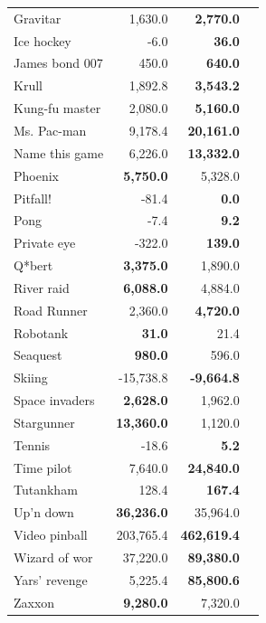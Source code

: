 \begin{table}[ht]
\begin{center}
\begin{small}
\begin{tabular}{lrrl}
Gravitar        & 1,630.0           & \textbf{2,770.0}   \\
Ice hockey      & -6.0              & \textbf{36.0}      \\
James bond 007  & 450.0             & \textbf{640.0}     \\
Krull           & 1,892.8           & \textbf{3,543.2}   \\
Kung-fu master  & 2,080.0           & \textbf{5,160.0}   \\
Ms. Pac-man     & 9,178.4           & \textbf{20,161.0}  \\
Name this game  & 6,226.0           & \textbf{13,332.0}  \\
Phoenix         & \textbf{5,750.0}  & 5,328.0            \\
Pitfall!        & -81.4             & \textbf{0.0}       \\
Pong            & -7.4              & \textbf{9.2}       \\
Private eye     & -322.0            & \textbf{139.0}     \\
Q*bert          & \textbf{3,375.0}  & 1,890.0            \\
River raid      & \textbf{6,088.0}  & 4,884.0            \\
Road Runner     & 2,360.0           & \textbf{4,720.0}   \\
Robotank        & \textbf{31.0}     & 21.4               \\
Seaquest        & \textbf{980.0}    & 596.0              \\
Skiing          & -15,738.8         & \textbf{-9,664.8}  \\
Space invaders  & \textbf{2,628.0}  & 1,962.0            \\
Stargunner      & \textbf{13,360.0} & 1,120.0            \\
Tennis          & -18.6             & \textbf{5.2}       \\
Time pilot      & 7,640.0           & \textbf{24,840.0}  \\
Tutankham       & 128.4             & \textbf{167.4}     \\
Up'n down       & \textbf{36,236.0} & 35,964.0           \\
Video pinball   & 203,765.4         & \textbf{462,619.4} \\
Wizard of wor   & 37,220.0          & \textbf{89,380.0}  \\
Yars' revenge   & 5,225.4           & \textbf{85,800.6}  \\
Zaxxon          & \textbf{9,280.0}  & 7,320.0           \\


\end{tabular}
\end{small}
\end{center}
\end{table}
